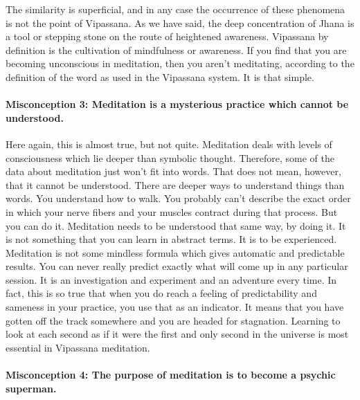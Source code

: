 The similarity is superficial, and in any case the occurrence of these phenomena
is not the point of Vipassana. As we have said, the deep concentration of Jhana
is a tool or stepping stone on the route of heightened awareness. Vipassana by
definition is the cultivation of mindfulness or awareness. If you find that you
are becoming unconscious in meditation, then you aren't meditating, according to
the definition of the word as used in the Vipassana system. It is that simple.

\paragraph*{Misconception 3: Meditation is a mysterious practice which cannot be understood.}

Here again, this is almost true, but not quite. Meditation deals with levels of
consciousness which lie deeper than symbolic thought. Therefore, some of the
data about meditation just won't fit into words. That does not mean, however,
that it cannot be understood. There are deeper ways to understand things than
words. You understand how to walk. You probably can't describe the exact order
in which your nerve fibers and your muscles contract during that process. But
you can do it. Meditation needs to be understood that same way, by doing it. It
is not something that you can learn in abstract terms. It is to be experienced.
Meditation is not some mindless formula which gives automatic and predictable
results. You can never really predict exactly what will come up in any
particular session. It is an investigation and experiment and an adventure every
time. In fact, this is so true that when you do reach a feeling of
predictability and sameness in your practice, you use that as an indicator. It
means that you have gotten off the track somewhere and you are headed for
stagnation. Learning to look at each second as if it were the first and only
second in the universe is most essential in Vipassana meditation.

\paragraph*{Misconception 4: The purpose of meditation is to become a psychic superman.}

